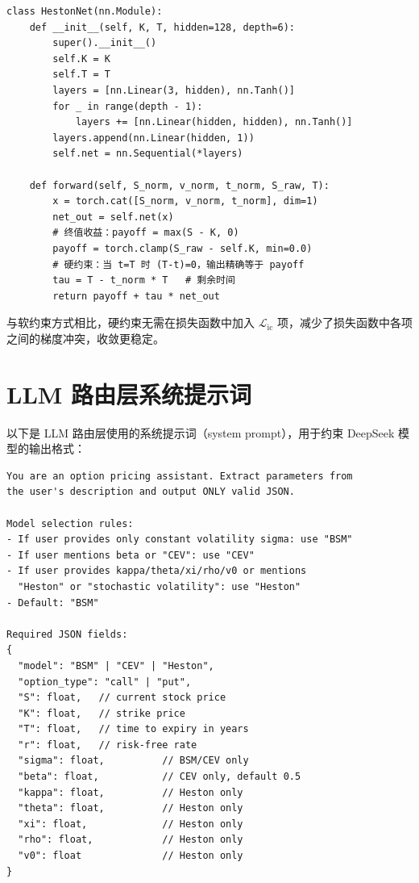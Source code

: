 \begin{verbatim}
class HestonNet(nn.Module):
    def __init__(self, K, T, hidden=128, depth=6):
        super().__init__()
        self.K = K
        self.T = T
        layers = [nn.Linear(3, hidden), nn.Tanh()]
        for _ in range(depth - 1):
            layers += [nn.Linear(hidden, hidden), nn.Tanh()]
        layers.append(nn.Linear(hidden, 1))
        self.net = nn.Sequential(*layers)

    def forward(self, S_norm, v_norm, t_norm, S_raw, T):
        x = torch.cat([S_norm, v_norm, t_norm], dim=1)
        net_out = self.net(x)
        # 终值收益：payoff = max(S - K, 0)
        payoff = torch.clamp(S_raw - self.K, min=0.0)
        # 硬约束：当 t=T 时 (T-t)=0，输出精确等于 payoff
        tau = T - t_norm * T   # 剩余时间
        return payoff + tau * net_out
\end{verbatim}

与软约束方式相比，硬约束无需在损失函数中加入 $\mathcal{L}_\text{ic}$ 项，减少了损失函数中各项之间的梯度冲突，收敛更稳定。

\section{LLM 路由层系统提示词}\label{app:llm_prompt}

以下是 LLM 路由层使用的系统提示词（system prompt），用于约束 DeepSeek 模型的输出格式：

\begin{verbatim}
You are an option pricing assistant. Extract parameters from
the user's description and output ONLY valid JSON.

Model selection rules:
- If user provides only constant volatility sigma: use "BSM"
- If user mentions beta or "CEV": use "CEV"
- If user provides kappa/theta/xi/rho/v0 or mentions
  "Heston" or "stochastic volatility": use "Heston"
- Default: "BSM"

Required JSON fields:
{
  "model": "BSM" | "CEV" | "Heston",
  "option_type": "call" | "put",
  "S": float,   // current stock price
  "K": float,   // strike price
  "T": float,   // time to expiry in years
  "r": float,   // risk-free rate
  "sigma": float,          // BSM/CEV only
  "beta": float,           // CEV only, default 0.5
  "kappa": float,          // Heston only
  "theta": float,          // Heston only
  "xi": float,             // Heston only
  "rho": float,            // Heston only
  "v0": float              // Heston only
}
\end{verbatim}


